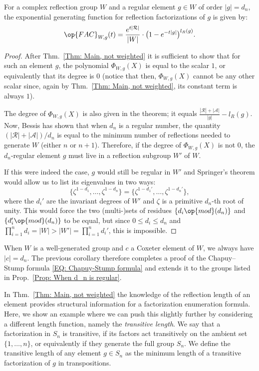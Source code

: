 \begin{coro}\label{Cor: Chapuy-Stump for dn}
For a complex reflection group $W$ and a regular element $g\in W$ of order $|g|=d_n$, the exponential generating function for reflection factorizations of $g$ is given by:$$
\op{FAC}_{W,g}(t)=\dfrac{e^{t|\mathcal{R}|}}{|W|}\cdot\big(1-e^{-t|g|}\big)^{l_R(g)}.$$ 
\end{coro}
\begin{proof}
After Thm.~\ref{Thm: Main, not weighted} it is sufficient to show that for such an element $g$, the polynomial $\Phi_{W,g}(X)$ is equal to the scalar $1$, or equivalently that its degree is $0$ (notice that then, $\Phi_{W,g}(X)$ cannot be any other scalar since, again by Thm.~\ref{Thm: Main, not weighted}, its constant term is always $1$). 

The degree of $\Phi_{W,g}(X)$ is also given in the theorem; it equals $\frac{|\mathcal{R}|+|\mathcal{A}|}{|g|}-l_R(g)$. Now, Bessis has shown \cite[Prop.~4.2]{bes-zariski} that when $d_n$ is a regular number, the quantity $(|\mathcal{R}|+|\mathcal{A}|)/d_n$ is equal to the minimum number of reflections needed to generate $W$ (either $n$ or $n+1$). Therefore, if the degree of $\Phi_{W,g}(X)$ is not $0$, the $d_n$-regular element $g$ must  live in a reflection subgroup $W'$ of $W$.

If this were indeed the case, $g$ would still be regular in $W'$ and Springer's theorem \cite[\S32-2]{kane-book-reflection-groups} would allow us to list its eigenvalues in two ways:$$
\{\zeta^{1-d_1},\ldots,\zeta^{1-d_n}\}=\{\zeta^{1-d_1'},\ldots,\zeta^{1-d_n'}\},$$ where the $d_i'$ are the invariant degrees of $W'$ and $\zeta$ is a primitive $d_n$-th root of unity. This would force the two (multi-)sets of residues $\{d_i \op{mod}(d_n)\}$ and $\{d_i'\op{mod}(d_n)\}$ to be equal, but since $0\leq d_i\leq d_n$ and $\prod_{i=1}^n d_i=|W|>|W'|=\prod_{i=1}^n d_i'$, this is impossible.
\end{proof}

\begin{rema}
When $W$ is a well-generated group and $c$ a Coxeter element of $W$, we always have $|c|=d_n$. The previous corollary therefore completes a proof of the Chapuy--Stump formula \eqref{EQ: Chapuy-Stump formula} and extends it to the groups listed in Prop.~\ref{Prop: When d_n is regular}.
\end{rema}

In Thm.~\ref{Thm: Main, not weighted} the knowledge of the reflection length of an element provides structural information for a factorization enumeration formula. Here, we show an example where we can push this slightly further by considering a different length function, namely the {\color{blue} \emph{transitive length}}. We say that a factorization in $S_n$ is transitive, if its factors act transitively on the ambient set $\{1,\ldots,n\}$, or equivalently if they generate the full group $S_n$. We define the transitive  length of any element $g\in S_n$ as the minimum length of a transitive factorization of $g$ in transpositions.

